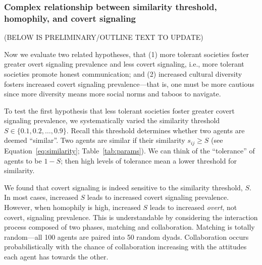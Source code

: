 \documentclass[11pt,letterpaper]{article}
\begin{document}
\subsubsection{Complex relationship between similarity threshold, homophily, and covert signaling}

(BELOW IS PRELIMINARY/OUTLINE TEXT TO UPDATE)

Now we evaluate two related hypotheses, that (1) more tolerant societies
foster greater overt signaling prevalence and less covert signaling, i.e., more
tolerant societies promote honest communication; 
and (2) increased cultural diversity fosters increased 
covert signaling prevalence---that is, one must be more cautious since more
diversity means more social norms and taboos to navigate. 

To test the first hypothesis that less tolerant societies foster greater
covert signaling prevalence, we
systematically varied the similarity threshold $S \in \{0.1, 0.2, \ldots, 0.9\}$.
Recall this threshold determines whether
two agents are deemed ``similar''. Two agents are similar if their similarity
$s_{ij} \geq S$ (see Equation~\ref{eq:similarity}; Table~\ref{tab:params}). 
We can think of the ``tolerance'' of agents to be $1-S$; then
high levels of tolerance mean a lower threshold for similarity. 

We found that covert signaling is indeed sensitive to the similarity threshold, 
$S$. In most cases, increased $S$ leads to increased covert signaling
prevalence. However, when homophily is high, increased $S$ leads to increased
\emph{overt}, not covert, signaling prevalence. This is understandable by
considering the interaction process composed of two phases, matching and
collaboration. Matching is totally random---all 100 agents are paired into
50 random dyads. Collaboration occurs probabilistically with the chance of
collaboration increasing with the attitudes each agent has towards the other.
\end{document}
